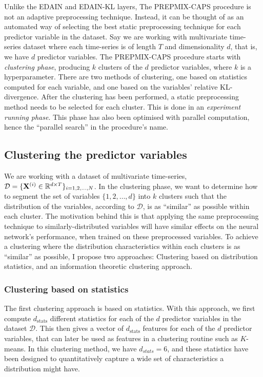 \documentclass{statsmsc}
\begin{document}
{Unlike the \ac{EDAIN} and \ac{EDAIN-KL} layers, The \ac{PREPMIX-CAPS} procedure 
is not an adaptive preprocessing technique. Instead, it can be thought of as an automated way
of selecting the best static preprocessing technique for each predictor variable in the dataset.
Say we are working with multivariate time-series dataset where each time-series is of length $T$
and dimensionality $d$, that is, we have $d$ predictor variables.
The \ac{PREPMIX-CAPS} procedure starts with \textit{clustering phase},
producing $k$ clusters of the $d$ predictor variables,
where $k$ is a hyperparameter. There are two methods of clustering, one based on statistics
computed for each variable, and one based on the variables' relative \ac{KL-divergence}.
After the clustering has been performed, a static preprocessing method needs to be selected
for each cluster. This is done in an \textit{experiment running phase}. This phase has also
been  optimised with parallel computation, hence the ``parallel search'' in the procedure's
name.

\subsection{Clustering the predictor variables}%
\label{sub:prepmix-clustering}

We are working with a dataset of multivariate time-series,
$\mathcal{D}=\{\mathbf{X}^{(i)} \in \mathbb{R}^{d \times T}\}_{i=1,2,\dots,N}$.  In the
clustering phase, we want to determine how to segment the set of variables
$\{1,2,\dots,d\}$ into $k$ clusters such that the distribution of the
variables, according to $\mathcal{D}$, is as ``similar'' as possible within
each cluster.  The motivation behind this is that applying the same
preprocessing technique to similarly-distributed variables will have similar
effects on the neural network's performance, when trained on these preprocessed
variables.  To achieve a clustering where the distribution characteristics
within each clusters is as ``similar'' as possible, I propose two approaches:
Clustering based on distribution statistics, and an information theoretic clustering approach.

\subsubsection{Clustering based on statistics}%
\label{sub:Clustering based on statistics}

The first clustering approach is based on statistics. With this approach, we first compute
$d_{\textrm{stats}}$ different statistics for each of the $d$ predictor variables in the dataset $\mathcal{D}$.
This then gives a vector of $d_{\textrm{stats}}$ features for each of the $d$ predictor variables,
that can later be used as features in a clustering routine such as $K$-means. In this clustering
method, we have $d_{stats}=6$, and these statistics have been designed to quantitatively
capture a wide set of characteristics a distribution might have.

}
\end{document}
